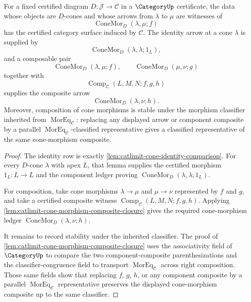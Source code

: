 \begin{theorem}\label{thm:catlimit-cone-morphism-category-package}
For a fixed certified diagram $D:\mathcal J\to\mathcal C$ in a $\CategoryUp$ certificate, the data whose objects are $D$-cones and whose arrows from $\lambda$ to $\mu$ are witnesses of
$$\operatorname{ConeMor}_{D}(\lambda,\mu;f)$$
has the certified category surface induced by $\mathcal C$. The identity arrow at a cone $\lambda$ is supplied by
$$\operatorname{ConeMor}_{D}(\lambda,\lambda;1_L),$$
and a composable pair
$$\operatorname{ConeMor}_{D}(\lambda,\mu;f),\qquad
\operatorname{ConeMor}_{D}(\mu,\nu;g)$$
together with
$$\operatorname{Comp}_{\mathcal C}(L,M,N;f,g,h)$$
supplies the composite arrow
$$\operatorname{ConeMor}_{D}(\lambda,\nu;h).$$
Moreover, composition of cone morphisms is stable under the morphism classifier inherited from $\operatorname{MorEq}_{\mathcal C}$: replacing any displayed arrow or component composite by a parallel $\operatorname{MorEq}_{\mathcal C}$-classified representative gives a classified representative of the same cone-morphism composite.
\end{theorem}
\begin{proof}
The identity row is exactly \autoref{lem:catlimit-cone-identity-comparison}. For every $D$-cone $\lambda$ with apex $L$, that lemma supplies the certified morphism $1_L:L\to L$ and the component ledger proving $\operatorname{ConeMor}_{D}(\lambda,\lambda;1_L)$.

For composition, take cone morphisms $\lambda\to\mu$ and $\mu\to\nu$ represented by $f$ and $g$, and take a certified composite witness $\operatorname{Comp}_{\mathcal C}(L,M,N;f,g,h)$. Applying \autoref{lem:catlimit-cone-morphism-composite-closure} gives the required cone-morphism ledger $\operatorname{ConeMor}_{D}(\lambda,\nu;h)$.

It remains to record stability under the inherited classifier. The proof of \autoref{lem:catlimit-cone-morphism-composite-closure} uses the associativity field of $\CategoryUp$ to compare the two component-composite parenthesizations and the classifier-congruence field to transport $\operatorname{MorEq}_{\mathcal C}$ across right composition. Those same fields show that replacing $f$, $g$, $h$, or any component composite by a parallel $\operatorname{MorEq}_{\mathcal C}$ representative preserves the displayed cone-morphism composite up to the same classifier.
\end{proof}


